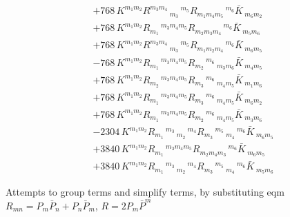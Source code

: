 \begin{align}
  &+768\,K^{{m_{1}} {m_{2}}} R^{{m_{3}} {m_{4}}}\,_{{m_{3}}}\,^{{m_{5}}} R_{{m_{1}} {m_{4}} {m_{5}}}\,^{{m_{6}}} \bar{K}\,_{{m_{6}} {m_{2}}}\\
  &+768\,K^{{m_{1}} {m_{2}}} R_{{m_{1}}}\,^{{m_{3}} {m_{4}} {m_{5}}} R_{{m_{2}} {m_{3}} {m_{4}}}\,^{{m_{6}}} \bar{K}\,_{{m_{5}} {m_{6}}}\\
  &+768\,K^{{m_{1}} {m_{2}}} R^{{m_{3}} {m_{4}}}\,_{{m_{3}}}\,^{{m_{5}}} R_{{m_{1}} {m_{2}} {m_{4}}}\,^{{m_{6}}} \bar{K}\,_{{m_{6}} {m_{5}}}\\
  &-768\,K^{{m_{1}} {m_{2}}} R_{{m_{1}}}\,^{{m_{3}} {m_{4}} {m_{5}}} R_{{m_{2}}}\,^{{m_{6}}}\,_{{m_{3}} {m_{6}}} \bar{K}\,_{{m_{4}} {m_{5}}}\\
  &+768\,K^{{m_{1}} {m_{2}}} R_{{m_{2}}}\,^{{m_{3}} {m_{4}} {m_{5}}} R_{{m_{3}}}\,^{{m_{6}}}\,_{{m_{4}} {m_{5}}} \bar{K}\,_{{m_{1}} {m_{6}}}\\
  &+768\,K^{{m_{1}} {m_{2}}} R_{{m_{1}}}\,^{{m_{3}} {m_{4}} {m_{5}}} R_{{m_{3}}}\,^{{m_{6}}}\,_{{m_{4}} {m_{5}}} \bar{K}\,_{{m_{6}} {m_{2}}}\\
  &+768\,K^{{m_{1}} {m_{2}}} R_{{m_{1}}}\,^{{m_{3}} {m_{4}} {m_{5}}} R_{{m_{2}}}\,^{{m_{6}}}\,_{{m_{4}} {m_{5}}} \bar{K}\,_{{m_{3}} {m_{6}}}\\
  &-2304\,K^{{m_{1}} {m_{2}}} R_{{m_{1}}}\,^{{m_{3}}}\,_{{m_{2}}}\,^{{m_{4}}} R_{{m_{3}}}\,^{{m_{5}}}\,_{{m_{4}}}\,^{{m_{6}}} \bar{K}\,_{{m_{6}} {m_{5}}}\\
  &+3840\,K^{{m_{1}} {m_{2}}} R_{{m_{1}}}\,^{{m_{3}} {m_{4}} {m_{5}}} R_{{m_{2}} {m_{4}} {m_{3}}}\,^{{m_{6}}} \bar{K}\,_{{m_{6}} {m_{5}}}\\
  &+3840\,K^{{m_{1}} {m_{2}}} R_{{m_{1}}}\,^{{m_{3}}}\,_{{m_{2}}}\,^{{m_{4}}} R_{{m_{3}}}\,^{{m_{5}}}\,_{{m_{4}}}\,^{{m_{6}}} \bar{K}\,_{{m_{5}} {m_{6}}}
\end{align}

Attempts to group terms and simplify terms, by substituting eqm $R_{mn} = P_m\bar{P}_n + P_n\bar{P}_m$, $R = 2P_m\bar{P}^m$

